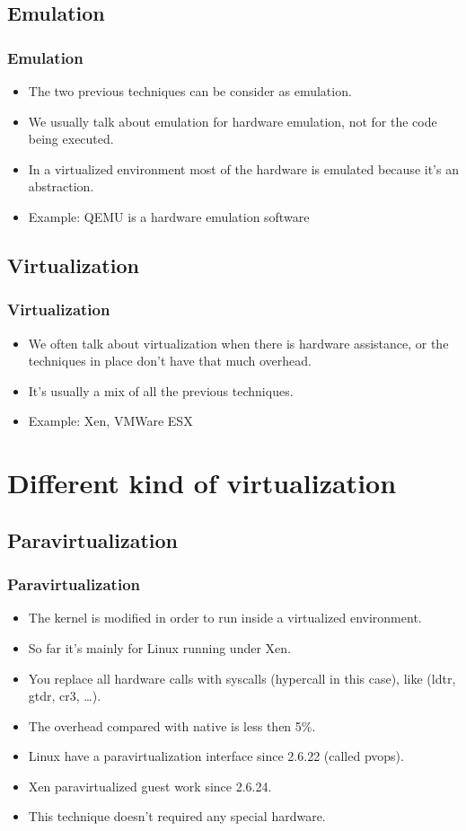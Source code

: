 \subsection{Emulation}
\begin{frame}
\frametitle{Emulation}
\begin{itemize}
\item The two previous techniques can be consider as emulation.
\item We usually talk about emulation for hardware emulation, not for the code being executed.
\item In a virtualized environment most of the hardware is emulated because it's an abstraction.
\item Example: QEMU is a hardware emulation software
\end{itemize}
\end{frame}

\subsection{Virtualization}
\begin{frame}
\frametitle{Virtualization}
\begin{itemize}
\item We often talk about virtualization when there is hardware assistance, or the techniques in place don't have that much overhead.
\item It's usually a mix of all the previous techniques.
\item Example: Xen, VMWare ESX
\end{itemize}
\end{frame}

\section{Different kind of virtualization}
\subsection{Paravirtualization}
\begin{frame}
\frametitle{Paravirtualization}
\begin{itemize}
\item The kernel is modified in order to run inside a virtualized environment.
\item So far it's mainly for Linux running under Xen.
\item You replace all hardware calls with syscalls (hypercall in this case), like (ldtr, gtdr, cr3, \ldots ).
\item The overhead compared with native is less then 5\%.
\item Linux have a paravirtualization interface since 2.6.22 (called pvops).
\item Xen paravirtualized guest work since 2.6.24.
\item This technique doesn't required any special hardware.
\end{itemize}
\end{frame}

